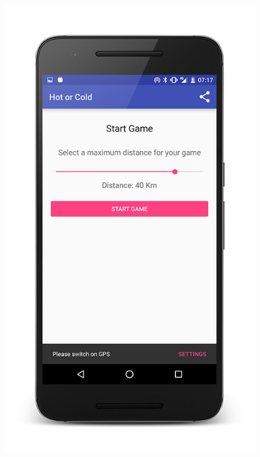 \documentclass[10pt, a4paper]{article}
\begin{document}
\begin{figure}[!htb]
  \includegraphics[width=1.0\textwidth]{phone_startgame_2}
  \caption{}
\endminipage
\end{figure}
\end{document}
